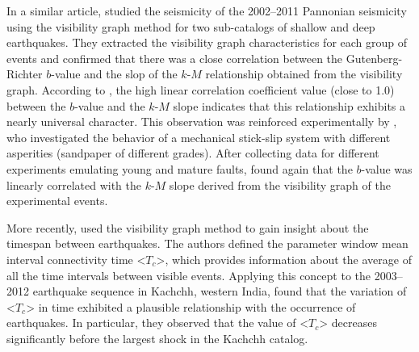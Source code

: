 In a similar article, \citet{Telesca2014} studied the seismicity of the 2002--2011 Pannonian seismicity using the visibility graph method for two sub-catalogs of shallow and deep earthquakes. They extracted the visibility graph characteristics for each group of events and confirmed that there was a close correlation between the Gutenberg-Richter $b$-value and the slop of the $k$-$M$ relationship obtained from the visibility graph. According to \citet{Telesca2014}, the high linear correlation coefficient value (close to 1.0) between the $b$-value and the $k$-$M$ slope indicates that this relationship exhibits a nearly universal character. This observation was reinforced experimentally by \citet{Telesca2014-pone}, who investigated the behavior of a mechanical stick-slip system with different asperities (sandpaper of different grades). After collecting data for different experiments emulating young and mature faults, \citet{Telesca2014-pone} found again that the $b$-value was linearly correlated with the $k$-$M$ slope derived from the visibility graph of the experimental events.

More recently, \citet{Telesca2016} used the visibility graph method to gain insight about the timespan between earthquakes. The authors defined the parameter window mean interval connectivity time <$T_c$>, which provides information about the average of all the time intervals between visible events. Applying this concept to the 2003--2012 earthquake sequence in Kachchh, western India, \citet{Telesca2016} found that the variation of <$T_c$> in time exhibited a plausible relationship with the occurrence of earthquakes. In particular, they observed that the value of <$T_c$> decreases significantly before the largest shock in the Kachchh catalog.

